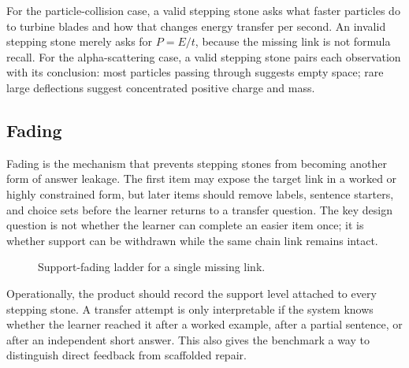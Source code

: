 \documentclass[11pt]{article}
\begin{document}
For the particle-collision case, a valid stepping stone asks what faster particles do to turbine blades and how that changes energy transfer per second. An invalid stepping stone merely asks for \(P=E/t\), because the missing link is not formula recall. For the alpha-scattering case, a valid stepping stone pairs each observation with its conclusion: most particles passing through suggests empty space; rare large deflections suggest concentrated positive charge and mass.

\subsection{Fading}

Fading is the mechanism that prevents stepping stones from becoming another form of answer leakage. The first item may expose the target link in a worked or highly constrained form, but later items should remove labels, sentence starters, and choice sets before the learner returns to a transfer question. The key design question is not whether the learner can complete an easier item once; it is whether support can be withdrawn while the same chain link remains intact.

\begin{figure}[H]
\centering
{}
\caption{Support-fading ladder for a single missing link.}
\label{fig:fading}
\end{figure}

Operationally, the product should record the support level attached to every stepping stone. A transfer attempt is only interpretable if the system knows whether the learner reached it after a worked example, after a partial sentence, or after an independent short answer. This also gives the benchmark a way to distinguish direct feedback from scaffolded repair.
\end{document}
